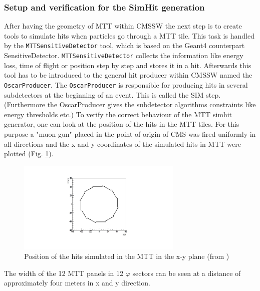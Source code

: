 		\subsubsection{Setup and verification for the SimHit generation}
			After having the geometry of MTT within CMSSW the next step is to create tools to simulate hits when particles go through a MTT tile.
			This task is handled by the \verb+MTTSensitiveDetector+ tool, which is based on the Geant4 counterpart SensitiveDetector.
			\verb+MTTSensitiveDetector+ collects the information like energy loss, time of flight or position step by step and stores it in a hit.
			Afterwards this tool has to be introduced to the general hit producer within CMSSW named the \verb+OscarProducer+.
			The \verb+OscarProducer+ is responsible for producing hits in several subdetectors at the beginning of an event.
			This is called the SIM step.
			(Furthermore the OscarProducer gives the subdetector algorithms constraints like energy thresholds etc.)
			To verify the correct behaviour of the MTT simhit generator, one can look at the position of the hits in the MTT tiles.
			For this purpose a "muon gun" placed in the point of origin of CMS was fired uniformly in all directions and the x and y coordinates of the simulated hits in MTT were plotted (Fig.
			\ref{fig:hitpos_mtt}).
			\begin{figure}[htbp]
				\centering
				\includegraphics[width=0.70\textwidth]{Figures/erdogan/hitpos_mtt.png}
				\caption{Position of the hits simulated in the MTT in the x-y plane (from \cite{paul_thesis})}
				\label{fig:hitpos_mtt}
			\end{figure}
			The width of the 12 MTT panels in 12 $\varphi$ sectors can be seen at a distance of approximately four meters in x and y direction.

